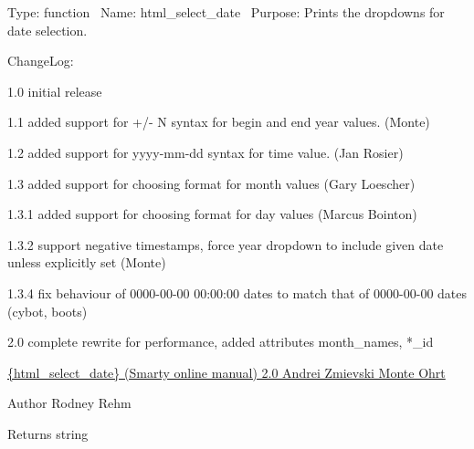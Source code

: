Type\+: function~\newline
 Name\+: html\+\_\+select\+\_\+date~\newline
 Purpose\+: Prints the dropdowns for date selection.

Change\+Log\+: 
\begin{DoxyPre}
\begin{DoxyItemize}
\item 1.0 initial release
\item 1.1 added support for +/- N syntax for begin
             and end year values. (Monte)
\item 1.2 added support for yyyy-mm-dd syntax for
             time value. (Jan Rosier)
\item 1.3 added support for choosing format for
             month values (Gary Loescher)
\item 1.3.1 added support for choosing format for
             day values (Marcus Bointon)
\item 1.3.2 support negative timestamps, force year
             dropdown to include given date unless explicitly set (Monte)
\item 1.3.4 fix behaviour of 0000-00-00 00:00:00 dates to match that
             of 0000-00-00 dates (cybot, boots)
\item 2.0 complete rewrite for performance,  
             added attributes month\_names, *\_id

\end{DoxyItemize}\end{DoxyPre}



\begin{DoxyPre}\hyperlink{}{\{html\_select\_date\}
     (Smarty online manual)
 2.0
 Andrei Zmievski 
 Monte Ohrt } 
\begin{DoxyAuthor}{Author}
Rodney Rehm

\end{DoxyAuthor}

\begin{DoxyReturn}{Returns}
string 

\end{DoxyReturn}
\end{DoxyPre}
